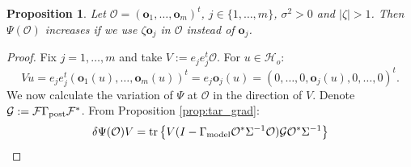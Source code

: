 \documentclass[ba]{imsart}
\newcommand{\hilo}{\mathcal{H}_o}
\newcommand{\obs}{\mathcal{O}}
\newcommand{\fwd}{\mathcal{F}}
\newcommand{\tar}{\Psi}
\newcommand{\meas}{\mathbf{o}}
\newcommand{\tr}[1]{\textup{tr}\left \{#1 \right \} }
\theoremstyle{plain}
\newtheorem{proposition}[theorem]{Proposition}
\theoremstyle{definition}
\theoremstyle{remark}
\providecommand{\DIFaddbegin}{} %
\providecommand{\DIFdelbegin}{} %
\providecommand{\DIFdelend}{} %
\newcommand{\DIFscaledelfig}{0.5}
\newlength{\DIFdelgraphicswidth} %
\newlength{\DIFdelgraphicsheight} %
\newcommand{\DIFaddincludegraphics}[2][]{{\color{blue}\fbox{\DIFOincludegraphics[#1]{#2}}}} %
\newcommand{\DIFdelincludegraphics}[2][]{%
\sbox{\DIFdelgraphicsbox}{\DIFOincludegraphics[#1]{#2}}%
\settoboxwidth{\DIFdelgraphicswidth}{\DIFdelgraphicsbox} %
\settoboxtotalheight{\DIFdelgraphicsheight}{\DIFdelgraphicsbox} %
\scalebox{\DIFscaledelfig}{%
\parbox[b]{\DIFdelgraphicswidth}{\usebox{\DIFdelgraphicsbox}\\[-\baselineskip] \rule{\DIFdelgraphicswidth}{0em}}\llap{\resizebox{\DIFdelgraphicswidth}{\DIFdelgraphicsheight}{%
\setlength{\unitlength}{\DIFdelgraphicswidth}%
\begin{picture}(1,1)%
\thicklines\linethickness{2pt} %
{\color[rgb]{1,0,0}\put(0,0){\framebox(1,1){}}}%
{\color[rgb]{1,0,0}\put(0,0){\line( 1,1){1}}}%
{\color[rgb]{1,0,0}\put(0,1){\line(1,-1){1}}}%
\end{picture}%
}\hspace*{3pt}}} %
} %
\DeclareRobustCommand{\DIFaddbegin}{\DIFOaddbegin \let\includegraphics\DIFaddincludegraphics} %
\DeclareRobustCommand{\DIFdelbegin}{\DIFOdelbegin \let\includegraphics\DIFdelincludegraphics} %
\DeclareRobustCommand{\DIFdelend}{\DIFOaddend \let\includegraphics\DIFOincludegraphics} %
\begin{document}
\begin{proposition}\label{prop:bigger_better}
  Let $\obs = (\meas_1,\dots,\meas_m)^t$, $j \in \{1,\dots,m\}$,
  $\sigma^2 > 0$ and $|\zeta| > 1$. Then $\tar(\obs)$ increases if we
  use $\zeta \meas_j$ in $\obs$ instead of $\meas_j$.
\end{proposition}

\begin{proof} 
  Fix $j=1,\dots,m$ and take $V:= e_j e_j^t \obs$. For $u
  \in \hilo$:
  \begin{equation*}
    Vu = e_je_j^t (\meas_1(u),\dots,\meas_m(u) )^t = e_j \meas_j(u)
    = (0,\dots,0,\meas_j(u),0,\dots,0)^t.
  \end{equation*}
  We now calculate the variation of $\tar$ at $\obs$ in the direction
  of $V$. Denote $\tmp: = \fwd \postcov \fwd^*$. From Proposition
  \ref{prop:tar_grad}:
  \DIFdelbegin %
\DIFdelend \DIFaddbegin \begin{align*}
     \delta \tar(\obs) V 
    &= \tr{V ( I - \modcov \obs^*\Sigma^{-1}\obs) \tmp \obs^* \Sigma^{-1}} \\

\end{align*}
\end{proof}
\end{document}
